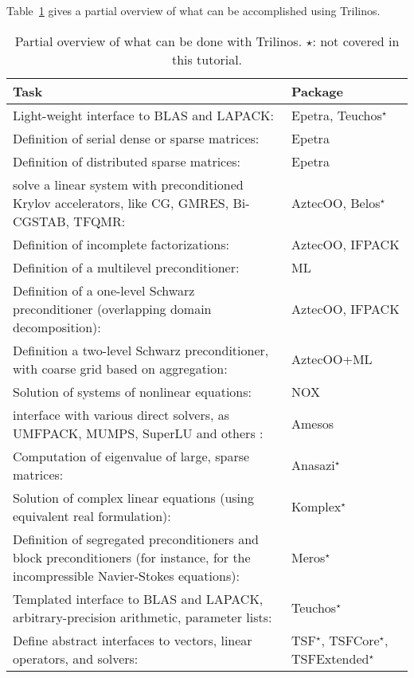 Table~\ref{tab:tripackages} gives a partial overview of what can be
accomplished using Trilinos.
\begin{table}[htbp]
  \centering
  \begin{tabular}{| p{10cm} | p{3cm} |}
    \hline
    {\bf Task} & {\bf Package} \\
    \hline
    Light-weight interface to BLAS and LAPACK: & Epetra, Teuchos$^\star$ \\
    Definition of serial dense or sparse matrices: & Epetra \\
    Definition of distributed sparse matrices:& Epetra \\
    solve a linear system with preconditioned Krylov accelerators, like
    CG, GMRES, Bi-CGSTAB, TFQMR:& AztecOO, Belos$^\star$ \\
    Definition of incomplete factorizations:& AztecOO, IFPACK \\
    Definition of a multilevel preconditioner:& ML \\
    Definition of a one-level Schwarz preconditioner (overlapping domain
    decomposition):& AztecOO, IFPACK \\
    Definition a two-level Schwarz preconditioner, with coarse grid based on
    aggregation:& AztecOO+ML \\
    Solution of  systems of nonlinear equations:& NOX \\
    interface with various direct solvers, as UMFPACK, MUMPS, SuperLU
    and others :& Amesos \\
    Computation of eigenvalue of large, sparse matrices:& Anasazi$^\star$
    \\
    Solution of complex linear equations (using equivalent real formulation):&
    Komplex$^\star$ \\
    Definition of segregated preconditioners and block preconditioners (for
    instance, for the incompressible Navier-Stokes equations):&
    Meros$^\star$ \\
    Templated interface to BLAS and LAPACK, arbitrary-precision
    arithmetic, parameter lists:& Teuchos$^\star$ \\
    Define abstract interfaces to vectors, linear operators, and solvers:& TSF$^\star$, TSFCore$^\star$, TSFExtended$^\star$    \\
    \hline
  \end{tabular}
  \caption{Partial overview of what can be done with Trilinos. $\star$:
    not covered in this tutorial.}
  \label{tab:tripackages}
\end{table}


